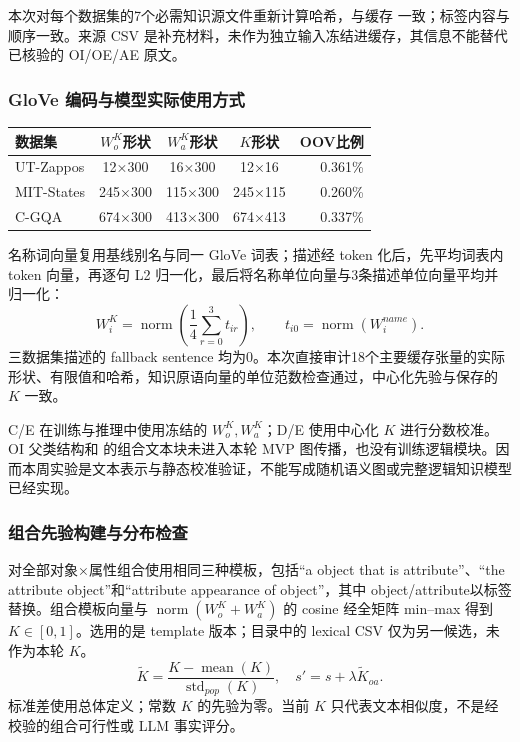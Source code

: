 \documentclass[12pt,a4paper,UTF8]{ctexart}
\newcommand{\file}[1]{\texttt{\detokenize{#1}}}
\newenvironment{reporttable}{\par\smallskip\begingroup\small\centering}{\par\endgroup\smallskip}
\begin{document}
本次对每个数据集的7个必需知识源文件重新计算哈希，与缓存 \file{input_sha256} 一致；标签内容与顺序一致。来源 CSV 是补充材料，未作为独立输入冻结进缓存，其信息不能替代已核验的 OI/OE/AE 原文。
\subsubsection{GloVe 编码与模型实际使用方式}

\begin{reporttable}

\begin{tabularx}{\linewidth}{|Y|c|c|c|r|}
\hline

\textbf{数据集} & \textbf{$W_o^K$形状} & \textbf{$W_a^K$形状} & \textbf{$K$形状} & \textbf{OOV比例} \\ \hline

UT-Zappos & 12×300 & 16×300 & 12×16 & 0.361\% \\ \hline

MIT-States & 245×300 & 115×300 & 245×115 & 0.260\% \\ \hline

C-GQA & 674×300 & 413×300 & 674×413 & 0.337\% \\ \hline

\end{tabularx}\end{reporttable}

名称词向量复用基线别名与同一 GloVe 词表；描述经 token 化后，先平均词表内 token 向量，再逐句 L2 归一化，最后将名称单位向量与3条描述单位向量平均并归一化：
\[
W_i^K=\operatorname{norm}\!\left(\frac{1}{4}\sum_{r=0}^{3}t_{ir}\right),
\qquad t_{i0}=\operatorname{norm}(W_i^{name}).
\]
三数据集描述的 fallback sentence 均为0。本次直接审计18个主要缓存张量的实际形状、有限值和哈希，知识原语向量的单位范数检查通过，中心化先验与保存的 $K$ 一致。

C/E 在训练与推理中使用冻结的 $W_o^K,W_a^K$；D/E 使用中心化 $K$ 进行分数校准。OI 父类结构和 \file{W_ao_K} 的组合文本块未进入本轮 MVP 图传播，也没有训练逻辑模块。因而本周实验是文本表示与静态校准验证，不能写成随机语义图或完整逻辑知识模型已经实现。
\subsubsection{组合先验构建与分布检查}
对全部对象×属性组合使用相同三种模板，包括“a object that is attribute”、“the attribute object”和“attribute appearance of object”，其中 object/attribute以标签替换。组合模板向量与 $\operatorname{norm}(W_o^K+W_a^K)$ 的 cosine 经全矩阵 min--max 得到 $K\in[0,1]$。选用的是 template 版本；目录中的 lexical CSV 仅为另一候选，未作为本轮 $K$。
\[
\widetilde K=\frac{K-\operatorname{mean}(K)}{\operatorname{std}_{pop}(K)},
\quad s'=s+\lambda\widetilde K_{oa}.
\]
标准差使用总体定义；常数 $K$ 的先验为零。当前 $K$ 只代表文本相似度，不是经校验的组合可行性或 LLM 事实评分。
\end{document}
